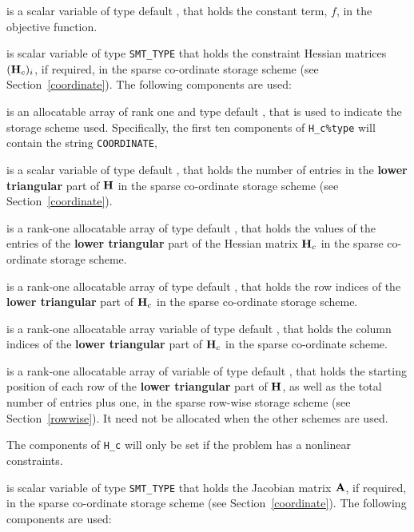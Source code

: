 \documentclass{galahad}
\begin{document}
\begin{description}
 is a scalar variable of type default \realdp, that holds the
constant term, $f$, in the objective function.

 is scalar variable of type {\tt SMT\_TYPE}
that holds the constraint Hessian matrices $({\mathbf{H}}_c)_i$, if required,
in the sparse co-ordinate storage scheme (see Section~\ref{coordinate}).
The following components are used:

\begin{description}

 is an allocatable array of rank one and type default
\character, that is used to indicate the storage scheme used. Specifically,
the first ten components of {\tt H\_c\%type} will contain the
string {\tt COORDINATE},

 is a scalar variable of type default \integer, that
holds the number of entries in the {\bf lower triangular} part of ${\mathbf{H}}$
in the sparse co-ordinate storage scheme (see Section~\ref{coordinate}).

 is a rank-one allocatable array of type default \realdp, that
holds the values of the entries of the {\bf lower triangular} part
of the Hessian matrix ${\mathbf{H}}_c$ in the sparse co-ordinate storage scheme.

 is a rank-one allocatable array of type default \integer,
that holds the row indices of the {\bf lower triangular} part of ${\mathbf{H}}_c$
in the sparse co-ordinate storage scheme.

 is a rank-one allocatable array variable of type default
\integer, that holds the column indices of the {\bf lower triangular} part of
${\mathbf{H}}_c$ in the sparse co-ordinate scheme.

 is a rank-one allocatable array of variable of type
default \integer, that holds the starting position of
each row of the {\bf lower triangular} part of ${\mathbf{H}}$, as well
as the total number of entries plus one, in the sparse row-wise storage
scheme (see Section~\ref{rowwise}). It need not be allocated when the
other schemes are used.
\end{description}

The components of {\tt H\_c} will only be set if the problem has a
nonlinear constraints.

 is scalar variable of type {\tt SMT\_TYPE}
that holds the Jacobian matrix ${\mathbf{A}}$, if required,
in the sparse co-ordinate storage scheme (see Section~\ref{coordinate}).
The following components are used:


\end{description}
\end{document}
